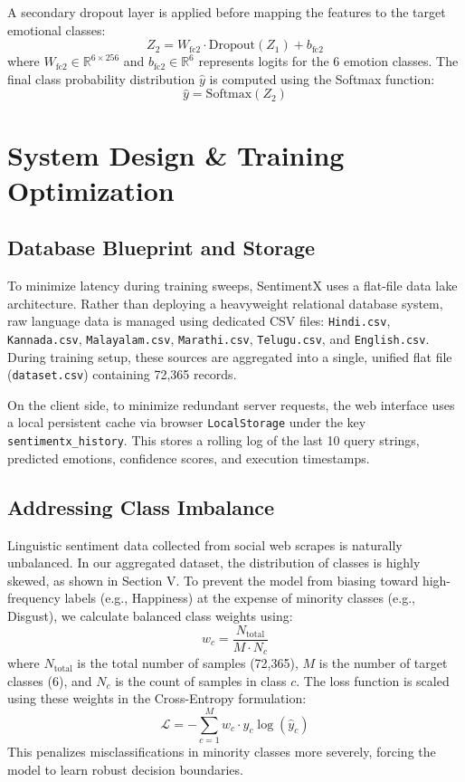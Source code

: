 \documentclass[conference]{IEEEtran}
\begin{document}
A secondary dropout layer is applied before mapping the features to the target emotional classes:
\begin{equation}
    Z_2 = W_{\text{fc2}} \cdot \text{Dropout}(Z_1) + b_{\text{fc2}}
\end{equation}
where $W_{\text{fc2}} \in \mathbb{R}^{6 \times 256}$ and $b_{\text{fc2}} \in \mathbb{R}^6$ represents logits for the 6 emotion classes. The final class probability distribution $\hat{y}$ is computed using the Softmax function:
\begin{equation}
    \hat{y} = \text{Softmax}(Z_2)
\end{equation}

\section{System Design \& Training Optimization}
\subsection{Database Blueprint and Storage}
To minimize latency during training sweeps, SentimentX uses a flat-file data lake architecture. Rather than deploying a heavyweight relational database system, raw language data is managed using dedicated CSV files: \texttt{Hindi.csv}, \texttt{Kannada.csv}, \texttt{Malayalam.csv}, \texttt{Marathi.csv}, \texttt{Telugu.csv}, and \texttt{English.csv}. During training setup, these sources are aggregated into a single, unified flat file (\texttt{dataset.csv}) containing 72,365 records.

On the client side, to minimize redundant server requests, the web interface uses a local persistent cache via browser \texttt{LocalStorage} under the key \texttt{sentimentx\_history}. This stores a rolling log of the last 10 query strings, predicted emotions, confidence scores, and execution timestamps.

\subsection{Addressing Class Imbalance}
Linguistic sentiment data collected from social web scrapes is naturally unbalanced. In our aggregated dataset, the distribution of classes is highly skewed, as shown in Section V. To prevent the model from biasing toward high-frequency labels (e.g., Happiness) at the expense of minority classes (e.g., Disgust), we calculate balanced class weights using:
\begin{equation}
    w_c = \frac{N_{\text{total}}}{M \cdot N_c}
\end{equation}
where $N_{\text{total}}$ is the total number of samples (72,365), $M$ is the number of target classes (6), and $N_c$ is the count of samples in class $c$. The loss function is scaled using these weights in the Cross-Entropy formulation:
\begin{equation}
    \mathcal{L} = -\sum_{c=1}^{M} w_c \cdot y_c \log(\hat{y}_c)
\end{equation}
This penalizes misclassifications in minority classes more severely, forcing the model to learn robust decision boundaries.
\end{document}
